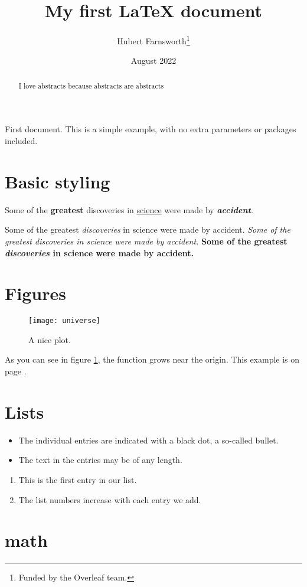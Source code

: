 \documentclass[12pt, letterpaper]{article}
\title{My first LaTeX document}
\author{Hubert Farnsworth\thanks{Funded by the Overleaf team.}}
\date{August 2022}
\begin{document}
\tableofcontents
\begin{abstract}
    I love abstracts because abstracts are abstracts
\end{abstract}

First document. This is a simple example, with no 
extra parameters or packages included.

\section{Basic styling}
Some of the \textbf{greatest}
discoveries in \underline{science} 
were made by \textbf{\textit{accident}}.

Some of the greatest \emph{discoveries} in science 
were made by accident.
\textit{Some of the greatest \emph{discoveries} 
in science were made by accident.}
\textbf{Some of the greatest \emph{discoveries} 
in science were made by accident.}

\section{Figures}
\begin{figure}[h]
    \centering
    \texttt{[image: universe]}
    \caption{A nice plot.}
    \label{fig:universe}
\end{figure}

As you can see in figure \ref{fig:universe}, the function grows near the origin. This example is on page \pageref{fig:universe}.

\section{Lists}
\begin{itemize}
  \item The individual entries are indicated with a black dot, a so-called bullet.
  \item The text in the entries may be of any length.
\end{itemize}

\begin{enumerate}
  \item This is the first entry in our list.
  \item The list numbers increase with each entry we add.
\end{enumerate}

\section{math}
\end{document}
